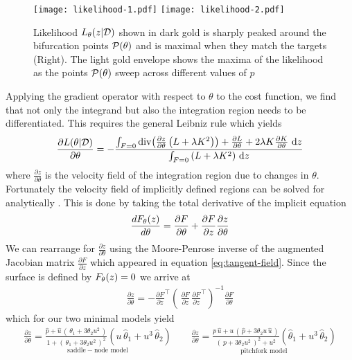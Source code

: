 \begin{figure}[H]
\centering{}
\captionsetup{justification=centering}
\texttt{[image: likelihood-1.pdf]}
\texttt{[image: likelihood-2.pdf]}
\caption{Likelihood $L_{\theta}(z|\mathcal{D})$ shown in dark gold is sharply peaked around the bifurcation points $\mathcal{P}(\theta)$ and is maximal when they match the targets (Right). The light gold envelope shows the maxima of the likelihood as the points $\mathcal{P}(\theta)$ sweep across different values of $p$}
\label{fig:likelihood}
\end{figure}
Applying the gradient operator with respect to $\theta$ to the cost function, we find that not only the integrand but also the integration region needs to be differentiated. This requires the general Leibniz rule \cite{Flanders1973DifferentiationSign} which yields
\begin{align}
\frac{\partial L(\theta|\mathcal{D})}{\partial\theta}=
-\frac{
\int_{F=0}
  \mathrm{div}\!
\left(\frac{\partial z}{\partial\theta}
  \left(L+\lambda K^2\right)
\right)
+\frac{\partial L}{\partial\theta}+
2\lambda K\frac{\partial K}{\partial\theta}
\,\,\mathrm{d}z
}{
\int_{F=0}
\left(
  L+\lambda K^2
\right)\,\mathrm{d}z
}\label{eq:gradient}
\end{align}
where $\frac{\partial z}{\partial\theta}$ is the velocity field of the integration region due to changes in $\theta$. Fortunately the velocity field of implicitly defined regions can be solved for analytically \cite{Jos2011OnSurface}. This is done by taking the total derivative of the implicit equation
\begin{align}
    \frac{dF_{\theta}(z)}{d\theta}=\frac{\partial F}{\partial\theta}+
    \frac{\partial F}{\partial z}\frac{\partial z}{\partial\theta}
\end{align}
We can rearrange for $\frac{\partial z}{\partial\theta}$ using the Moore-Penrose inverse of the augmented Jacobian matrix $\frac{\partial F}{\partial z}$ which appeared in equation \eqref{eq:tangent-field}. Since the surface is defined by $F_{\theta}(z)=0$ we arrive at
\begin{align}
    \frac{\partial z}{\partial\theta} = - \frac{\partial F}{\partial z}^\top
    \left(\,
        \frac{\partial F}{\partial z}\,\frac{\partial F}{\partial z}^\top
    \right)^{-1}
    \frac{\partial F}{\partial\theta}
\end{align}
which for our two minimal models yield
\begin{align}
    \underset{\mathrm{saddle-node\,\,model}}{
    \frac{\partial z}{\partial\theta} =
        \frac{ \hat{p}+\hat{u}\,(\,\theta_1+3\theta_2 u^2\,) }{1+(\,\theta_1+3\theta_2 u^2\,)^2}
        \left( u\,\hat{\theta}_1 + u^3\,\hat{\theta}_2 \right)}
    \qquad
    \underset{\mathrm{pitchfork\,\,model}}{
    \frac{\partial z}{\partial\theta} =
        \frac{ p\,\hat{u} + u\,(\,\hat{p}+3\theta_2u\,\hat{u}\,) }{(\,p+3\theta_2 u^2\,)^2 + u^2 }
        \left( \hat{\theta}_1 + u^3\,\hat{\theta}_2 \right)}
    \label{eq:velocity-field-examples}
\end{align}
